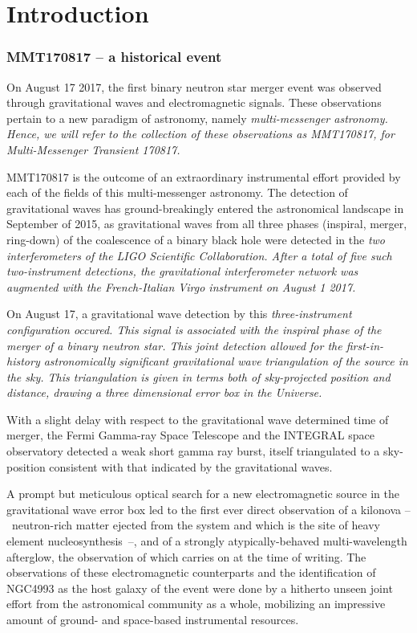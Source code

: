 \part{Introduction}

\section{MMT170817 -- a historical event}
On August 17 2017, the first binary neutron star merger event was observed through gravitational waves and electromagnetic signals. These observations pertain to a new paradigm of astronomy, namely \it{multi-messenger astronomy}. Hence, we will refer to the collection of these observations as MMT170817, for \it{Multi-Messenger Transient 170817}.

MMT170817 is the outcome of an extraordinary instrumental effort provided by each of the fields of this multi-messenger astronomy. The detection of gravitational waves has ground-breakingly entered the astronomical landscape in September of 2015, as gravitational waves from all three phases (inspiral, merger, ring-down) of the coalescence of a binary black hole were detected in the \it{two} interferometers of the LIGO Scientific Collaboration. After a total of five such two-instrument detections, the gravitational interferometer network was augmented with the French-Italian Virgo instrument on August 1 2017.

On August 17, a gravitational wave detection by this \it{three}-instrument configuration occured. This signal is associated with the inspiral phase of the merger of a binary neutron star. This joint detection allowed for the first-in-history astronomically significant gravitational wave triangulation of the source in the sky. This triangulation is given in terms both of sky-projected position and distance, drawing a three dimensional error box in the Universe.

With a slight delay with respect to the gravitational wave determined time of merger, the Fermi Gamma-ray Space Telescope and the INTEGRAL space observatory detected a weak short gamma ray burst, itself triangulated to a sky-position consistent with that indicated by the gravitational waves.

A prompt but meticulous optical search for a new electromagnetic source in the gravitational wave error box led to the first ever direct observation of a kilonova --~neutron-rich matter ejected from the system and which is the site of heavy element nucleosynthesis~--, and of a strongly atypically-behaved multi-wavelength afterglow, the observation of which carries on at the time of writing. The observations of these electromagnetic counterparts and the identification of NGC4993 as the host galaxy of the event were done by a hitherto unseen joint effort from the astronomical community as a whole, mobilizing an impressive amount of ground- and space-based instrumental resources.



